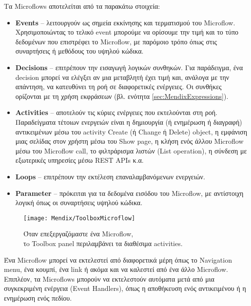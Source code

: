             Τα Microflows αποτελείται από τα παρακάτω στοιχεία:
                \begin{itemize}[label={\tiny \blacksquare}]
                    \setlength\itemsep{-0.25em}
                    \item \textbf{Events} -- λειτουργούν ως σημεία εκκίνησης και τερματισμού του Microflow. Χρησιμοποιώντας το τελικό event μπορούμε να ορίσουμε την τιμή και το τύπο δεδομένων που επιστρέφει το Microflow, με παρόμοιο τρόπο όπως στις συναρτήσεις ή μεθόδους του υψηλού κώδικα.
                    \item \textbf{Decisions} -- επιτρέπουν την εισαγωγή λογικών συνθηκών. Για παράδειγμα, ένα decision μπορεί να ελέγξει αν μια μεταβλητή έχει τιμή και, ανάλογα με την απάντηση, να κατευθύνει τη ροή σε διαφορετικές ενέργειες. Οι συνθήκες ορίζονται με τη χρήση εκφράσεων (βλ. ενότητα \ref{sec:MendixExpressions}).
                    \item \textbf{Activities} -- αποτελούν τις κύριες ενέργειες που εκτελούνται στη ροή. Παραδείγματα τέτοιων ενεργειών είναι η δημιουργία (ή ενημέρωση ή διαγραφή) αντικειμένων μέσω του activity Create (ή Change ή Delete) object, η εμφάνιση μιας σελίδας στον χρήστη μέσω του Show page, η κλήση ενός άλλου Microflow μέσω του Microflow call, το φιλτράρισμα λιστών (List operation), η σύνδεση με εξωτερικές υπηρεσίες μέσω REST APIs κ.α.
                    \item \textbf{Loops} --  επιτρέπουν την εκτέλεση επαναλαμβανόμενων ενεργειών.
                    \item \textbf{Parameter} -- πρόκειται για τα δεδομένα εισόδου του Microflow, με αντίστοιχη λογική όπως οι συναρτήσεις υψηλού κώδικα.
                \end{itemize}

            \begin{figure}[h!] \noindent \centering
                    \texttt{[image: Mendix/ToolboxMicroflow]}
                    \caption{\centering Όταν επεξεργαζόμαστε ένα Microflow, \\ τo Toolbox panel περιλαμβάνει τα διαθέσιμα activities.}
            \end{figure}
            Ένα Microflow μπορεί να εκτελεστεί από διαφορετικά μέρη όπως το Navigation menu, ένα κουμπί, ένα link ή ακόμα και να καλεστεί από ένα άλλο Microflow. Επιπλέον, τα Microflows μπορούν να εκτελεστούν αυτόματα μετά από μια συγκεκριμένη ενέργεια (Event Handlers), όπως η αποθήκευση ενός αντικειμένου ή η ενημέρωση ενός πεδίου.

